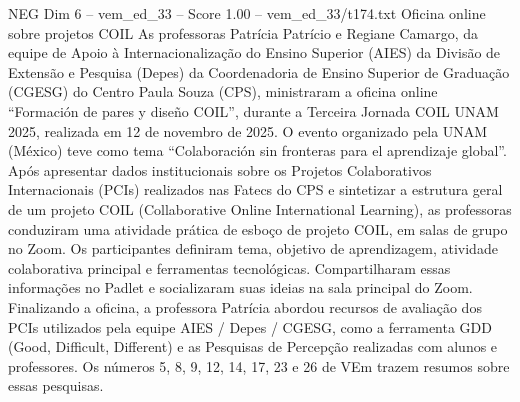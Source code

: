\begin{textsample}{NEG Dim 6 – vem\_ed\_33 – Score 1.00 – vem\_ed\_33/t174.txt}  \label{ex:f6_neg_095}
Oficina online sobre projetos COIL As professoras Patrícia Patrício e Regiane Camargo, da equipe de Apoio à Internacionalização do Ensino Superior (AIES) da Divisão de Extensão e Pesquisa (Depes) da Coordenadoria de Ensino Superior de Graduação (CGESG) do Centro Paula Souza (CPS), ministraram a oficina online “Formación de pares y diseño COIL”, durante a Terceira Jornada COIL UNAM 2025, realizada em 12 de novembro de 2025.
O evento organizado pela UNAM (México) teve como tema “Colaboración sin fronteras para el aprendizaje global”.
Após apresentar dados institucionais sobre os Projetos Colaborativos Internacionais (PCIs) realizados nas Fatecs do CPS e sintetizar a estrutura geral de um projeto COIL (Collaborative Online International Learning), as professoras conduziram uma atividade prática de esboço de projeto COIL, em salas de grupo no Zoom.
Os participantes definiram tema, objetivo de aprendizagem, atividade colaborativa principal e ferramentas tecnológicas.
Compartilharam essas informações no Padlet e socializaram suas ideias na sala principal do Zoom.
Finalizando a oficina, a professora Patrícia abordou recursos de avaliação dos PCIs utilizados pela equipe AIES / Depes / CGESG, como a ferramenta GDD (Good, Difficult, Different) e as Pesquisas de Percepção realizadas com alunos e professores.
Os números 5, 8, 9, 12, 14, 17, 23 e 26 de VEm trazem resumos sobre essas pesquisas.

\end{textsample}
